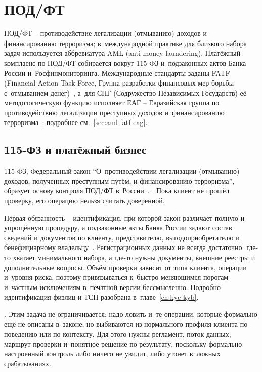 
\chapter{ПОД/ФТ}\label{ch:aml}
ПОД/ФТ -- противодействие легализации (отмыванию) доходов
и финансированию терроризма; в~международной практике
для близкого набора задач используется аббревиатура AML
(anti-money laundering). Платёжный комплаенс по ПОД/ФТ
собирается вокруг 115-ФЗ
и~подзаконных актов Банка России и~Росфинмониторинга. Международные стандарты заданы FATF (Financial Action Task Force, Группа разработки финансовых мер борьбы с~отмыванием денег)~\cite{fatf-recs},
а~для СНГ (Содружество Независимых Государств) её методологическую функцию исполняет ЕАГ -- Евразийская группа по противодействию легализации преступных доходов и~финансированию терроризма~\cite{eag-overview}; подробнее см.\ \autoref{sec:aml-fatf-eag}.

\section{115-ФЗ и платёжный бизнес}\label{sec:aml-115fz}

115-ФЗ, Федеральный закон \enquote{О~противодействии
  легализации (отмыванию) доходов, полученных преступным путём, и
финансированию терроризма}, образует основу контроля ПОД/ФТ в~России~\cite{fz-115}. .
Пока клиент не прошёл проверку, его операцию нельзя считать
доверенной.

Первая обязанность -- идентификация, при которой закон различает
полную и упрощённую процедуру, а подзаконные акты Банка России
задают состав сведений и документов по клиенту, представителю,
выгодоприобретателю и бенефициарному владельцу~\cite{cbr-499p}.
Регистрационных данных не всегда достаточно: где-то хватает минимального
набора, а где-то нужны документы, внешние реестры и дополнительные
вопросы. Объём проверки зависит от типа клиента, операции и~уровня
риска, поэтому привязываться к~быстро меняющимся порогам и~частным
исключениям в~печатной версии бессмысленно. Подробно идентификация
физлиц и ТСП разобрана в~главе~\ref{ch:kyc-kyb}.

. Этим задача не
ограничивается: надо ловить и~те операции, которые формально
ещё не описаны в~законе, но выбиваются из нормального профиля
клиента по поведению или по контексту. Для этого нужны регламент,
поток данных, маршрут проверки и~понятное решение по результату,
поскольку формально настроенный контроль либо ничего не увидит,
либо утонет в~ложных срабатываниях.

